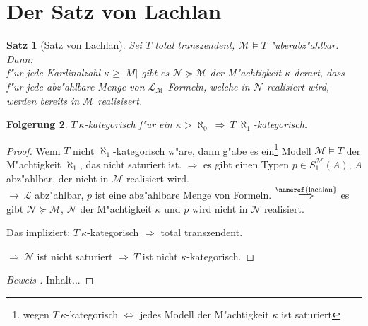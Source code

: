 \documentclass[a4paper,12pt,numbers=noenddot,parskip=full]{scrartcl}
\newcommand{\scrL}{\mathcal{L}}
\newcommand{\scrM}{\mathcal{M}}
\newcommand{\scrN}{\mathcal{N}}
\theoremstyle{dotless}
\newtheorem{theorem}{Satz}[section]
\newtheorem{corollary}[theorem]{Folgerung}
\begin{document}
\section{Der Satz von Lachlan}
\begin{theorem}[Satz von Lachlan]\label{lachlan}
	Sei $T$ total transzendent, $\scrM \models T$ "uberabz"ahlbar. Dann:\\
	f"ur jede Kardinalzahl $\kappa \geq |M|$ gibt es $\scrN \succeq \scrM$ der M"achtigkeit $\kappa$ derart, dass f"ur jede abz"ahlbare Menge von $\scrL_\scrM$-Formeln, welche in $\scrN$ realisiert wird, werden bereits in $\scrM$ realisisert.
\end{theorem}
\begin{corollary}
	$T~\kappa$-kategorisch f"ur ein $\kappa > \aleph_0~ \Rightarrow~ T~ \aleph_1$-kategorisch.
\end{corollary}
\begin{proof}
	Wenn $T$ nicht $\aleph_1$-kategorisch w"are, dann g"abe es ein\footnote{wegen $T~\kappa$-kategorisch $\Leftrightarrow$ jedes Modell der M"achtigkeit $\kappa$ ist saturiert} Modell $\scrM \models T$ der M"achtigkeit $\aleph_1$, das nicht saturiert ist. $\Rightarrow$ es gibt einen Typen $p \in S_1^\scrM(A)$, $A$ abz"ahlbar, der nicht in $\scrM$ realisiert wird.\\
	$\longrightarrow~ \scrL$ abz"ahlbar, $p$ ist eine abz"ahlbare Menge von Formeln. $\overset{\text{\nameref{lachlan}}}{\Longrightarrow}$ es gibt $\scrN \succeq \scrM$, $\scrN$ der M"achtigkeit $\kappa$ und $p$ wird nicht in $\scrN$ realisiert.
	
	Das impliziert: $T~ \kappa$-kategorisch $\Rightarrow$ total transzendent.
	
	$\Rightarrow~\scrN$ ist nicht saturiert $\Rightarrow~T$ ist nicht $\kappa$-kategorisch.
\end{proof}
\begin{proof}[Beweis ]
	Inhalt...
\end{proof}
\end{document}
